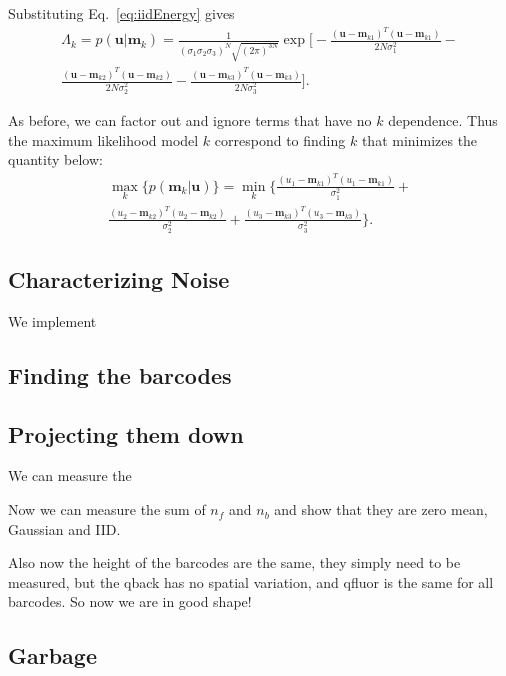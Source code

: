 Substituting Eq.~\ref{eq:iidEnergy} gives
\begin{multline}
\Lambda_k=p(\mathbf{u}|\mathbf{m}_k) =\frac{1}{ (\sigma_1\sigma_2\sigma_3)^N  \sqrt{ (2\pi)^{3N}}  }  \exp\Bigg[ -\frac{(\mathbf{u}-\mathbf{m}_{k1})^T(\mathbf{u}-\mathbf{m}_{k1})} {2 N \sigma_1^2 }   - \\ \frac{(\mathbf{u}-\mathbf{m}_{k2})^T(\mathbf{u}-\mathbf{m}_{k2})} {2 N \sigma_2^2 } -\frac{(\mathbf{u}-\mathbf{m}_{k3})^T(\mathbf{u}-\mathbf{m}_{k3})} {2 N \sigma_3^2 }    \Bigg].
\end{multline}

As before, we can factor out and ignore terms that have no $k$ dependence. Thus the maximum likelihood model $k$ correspond to finding $k$ that minimizes the quantity below:
\begin{multline}
\max_k   \big\{ p(\mathbf{m}_k|\mathbf{u}) \big\} =  \min_k  \Bigg\{  \frac{(u_1-\mathbf{m}_{k1})^T(u_1-\mathbf{m}_{k1})}{\sigma_1^2} +\\  
\frac{(u_2-\mathbf{m}_{k2})^T(u_2-\mathbf{m}_{k2})}{\sigma_2^2} + \frac{(u_3-\mathbf{m}_{k3})^T(u_3-\mathbf{m}_{k3})}{\sigma_3^2} \Bigg\}. 
\end{multline}







\subsection{Characterizing Noise}  
We implement 
\subsection{Finding the barcodes}
\subsection{Projecting them down}


We can measure the 

Now we can measure the sum of  $n_f$ and $n_b$ and show that they are  zero mean, Gaussian and IID. 


Also now  the height of the barcodes are the same, they simply need to be measured, but the qback has no spatial variation, and qfluor is the same for all barcodes. So now we are in good shape!




\subsection{Garbage	} 

